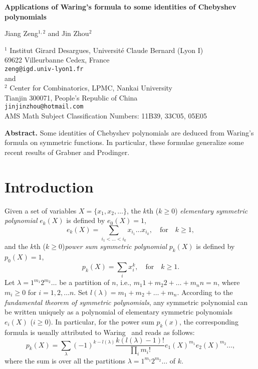 \documentclass[12pt]{article}
\newcommand\la{\lambda}
\begin{document}
\begin{center}
{\Large\bf Applications of Waring's formula to some identities of
Chebyshev polynomials}
\end{center}

\vskip 2mm \centerline{ Jiang Zeng$^{1,2}$ and Jin Zhou$^2$}

\begin{center} \small $^1$ Institut Girard Desargues,
Universit\'e Claude Bernard (Lyon I)\\
69622 Villeurbanne Cedex, France \\
{\tt zeng@igd.univ-lyon1.fr}\\
and\\
$^2$ Center for Combinatorics, LPMC,
Nankai University\\
 Tianjin 300071, People's Republic of China\\
{\tt jinjinzhou@hotmail.com} \\
\vspace{10pt}
\small AMS Math Subject Classification Numbers: 11B39, 33C05, 05E05\\
\end{center}

 \noindent
\textbf{Abstract.} Some identities of Chebyshev polynomials are
deduced from Waring's formula on symmetric functions. In
particular, these formulae generalize some recent results of
Grabner and Prodinger.
\section{Introduction}

Given a set of variables $X=\{x_1,x_2,\ldots\}$, the $k$th ($k\geq
0$) \emph{elementary symmetric polynomial} $e_{k}(X)$ is defined
by $e_0(X)=1$,
$$
e_k(X)=\sum_{i_1<\ldots<i_k}x_{i_1}\ldots x_{i_k},\quad
\text{for}\quad k\geqslant 1,
$$
 and  the $k$th  ($k\geq
0$)\emph{power sum symmetric polynomial} $p_{k}(X)$ is defined by
$p_0(X)=1$,
$$
p_k(X)=\sum_ix_i^k,\quad \text{for}\quad k\geqslant 1.
$$
Let $\la=1^{m_1}2^{m_2}\ldots $ be a partition of $n$, i.e., $m_1
1+m_2 2+\ldots +m_n n=n$, where $m_i\geq 0$ for $i=1,2,\ldots n$.
Set $l(\la)=m_1+m_2+\ldots +m_n$. According to the
\emph{fundamental theorem of symmetric polynomials}, any symmetric
polynomial can be written uniquely as a polynomial of elementary
symmetric polynomials $e_i(X)$ ($i\geq 0$). In particular, for the
power sum $p_k(x)$, the corresponding formula  is usually
attributed to Waring~\cite{CLY,Mac} and reads as follows:
\begin{equation}\label{war}
p_k(X)=\sum_{\la}(-1)^{k-l(\lambda)}\frac{k(l(\lambda)-1)!}
{\prod_{i}{m_{i}!}}e_{1}(X)^{m_1}e_{2}(X)^{m_2}\ldots,
\end{equation}
where the sum is over all the partitions
$\la=1^{m_1}2^{m_2}\ldots$ of $k$.
\end{document}
